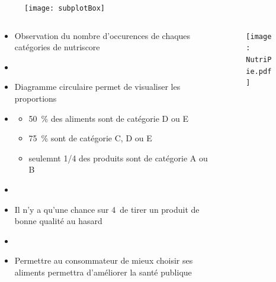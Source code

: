 \begin{frame}{\insertsubsection}
  \begin{figure}
    \texttt{[image: subplotBox]}
  \end{figure}
\end{frame}

\begin{frame}{\insertsubsection}
  \begin{columns}
    \begin{column}{.5\textwidth}
      \begin{itemize}
        \item Observation du nombre d'occurences de chaques catégories de nutriscore
        \item[]
        \item Diagramme circulaire permet de visualiser les proportions
        \item[]
          \begin{itemize}
            \item \qty{50}{\percent} des aliments sont de catégorie D ou E
            \item \qty{75}{\percent} sont de catégorie C, D ou E
            \item seulemnt 1/4 des produits sont de catégorie A ou B
          \end{itemize}
        \item[]
        \item Il n'y a qu'une chance sur 4 de tirer un produit de bonne qualité au hasard
        \item[]
        \item Permettre au consommateur de mieux choisir ses aliments permettra d'améliorer la santé publique
      \end{itemize}
    \end{column}
    \begin{column}{.5\textwidth}
      \begin{figure}
        \texttt{[image: NutriPie.pdf]}
      \end{figure}
    \end{column}
  \end{columns}
\end{frame}

